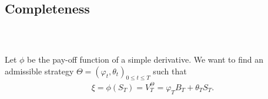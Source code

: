\documentclass{beamer}
\numberwithin{equation}{section}
\begin{document}

\subsection{Completeness}
\begin{frame}\frametitle{{\normalsize \secname} \\ {\large \subsecname}}
    Let $\phi$ be the pay-off function of a simple derivative. We want to find an admissible strategy $\Theta = (\varphi_t, \theta_t)_{0 \leq t \leq T}$ such that
    \begin{align*}
        \xi = \phi(S_T) = V_T^{\Theta} = \varphi_TB_T + \theta_TS_T.
    \end{align*}
\end{frame}
\end{document}
